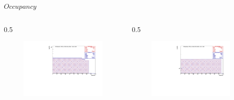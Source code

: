 \documentclass{beamer}
\begin{document}
\begin{frame}{$Occupancy$}
\vspace{-4.4mm}
\begin{columns}
    \begin{column}{0.5 \framewidth}
    \begin{figure}[H]
          \centering
          \hspace*{-2em}
        \includegraphics[width=1.1\columnwidth]{figures/pdf/figure_00004_nhitsvschannel_roc_simulation_281.pdf}
          \label{fig:dfjkdsfh} 
\end{figure}    
    \end{column}
    \begin{column}{0.5 \framewidth}
           \begin{figure}[H]
          \centering
          \hspace*{-2em}
        \includegraphics[width=1.1\columnwidth]{figures/pdf/figure_00002_nhitsvschannel_roc_simulation_2.pdf}

\end{figure}
\end{column}
\end{columns}
\end{frame}
\end{document}
